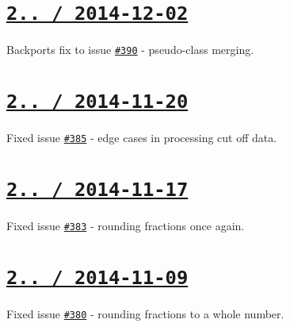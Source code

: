 \section*{\href{https://github.com/jakubpawlowicz/clean-css/compare/v2.2.19...v2.2.20}{\tt 2.. / 2014-\/12-\/02} }


\begin{DoxyItemize}
\item Backports fix to issue \href{https://github.com/jakubpawlowicz/clean-css/issues/390}{\tt \#390} -\/ pseudo-\/class merging.
\end{DoxyItemize}

\section*{\href{https://github.com/jakubpawlowicz/clean-css/compare/v2.2.18...v2.2.19}{\tt 2.. / 2014-\/11-\/20} }


\begin{DoxyItemize}
\item Fixed issue \href{https://github.com/jakubpawlowicz/clean-css/issues/385}{\tt \#385} -\/ edge cases in processing cut off data.
\end{DoxyItemize}

\section*{\href{https://github.com/jakubpawlowicz/clean-css/compare/v2.2.17...v2.2.18}{\tt 2.. / 2014-\/11-\/17} }


\begin{DoxyItemize}
\item Fixed issue \href{https://github.com/jakubpawlowicz/clean-css/issues/383}{\tt \#383} -\/ rounding fractions once again.
\end{DoxyItemize}

\section*{\href{https://github.com/jakubpawlowicz/clean-css/compare/v2.2.16...v2.2.17}{\tt 2.. / 2014-\/11-\/09} }


\begin{DoxyItemize}
\item Fixed issue \href{https://github.com/jakubpawlowicz/clean-css/issues/380}{\tt \#380} -\/ rounding fractions to a whole number.
\end{DoxyItemize}

